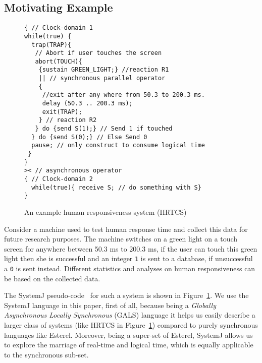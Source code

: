 \subsection{Motivating Example}
\label{sec:motivating-example}

\begin{figure}[t!]
\begin{minipage}{5cm}
  \begin{scriptsize}
    
\begin{verbatim}
{ // Clock-domain 1
while(true) {
  trap(TRAP){
   // Abort if user touches the screen
   abort(TOUCH){
    {sustain GREEN_LIGHT;} //reaction R1
    || // synchronous parallel operator
    {
     //exit after any where from 50.3 to 200.3 ms.
     delay (50.3 .. 200.3 ms); 
     exit(TRAP); 
    } // reaction R2
   } do {send S(1);} // Send 1 if touched 
  } do {send S(0);} // Else Send 0
  pause; // only construct to consume logical time
 }
}
>< // asynchronous operator
{ // Clock-domain 2
  while(true){ receive S; // do something with S}
}
\end{verbatim}
  \end{scriptsize}
\end{minipage}
\caption{An example human responsiveness system (HRTCS)}
\label{fig:1}
\end{figure}

Consider a machine used to test human response time and collect this
data for future research purposes. The machine switches on a green light
on a touch screen for anywhere between 50.3 ms to 200.3 ms, if the user
can touch this green light then she is successful and an integer
\texttt{1} is sent to a database, if unsuccessful a \texttt{0} is sent
instead. Different statistics and analyses on human responsiveness can
be based on the collected data.

The SystemJ pseudo-code~\cite{amal10} for such a system is shown in
Figure~\ref{fig:1}. We use the SystemJ language in this paper, first of
all, because being a \textit{Globally Asynchronous Locally Synchronous}
(GALS) language it helps us easily describe a larger class of systems
(like HRTCS in Figure~\ref{fig:1}) compared to purely synchronous
languages like Esterel. Moreover, being a super-set of Esterel, SystemJ
allows us to explore the marriage of real-time and logical time, which
is equally applicable to the synchronous sub-set.

